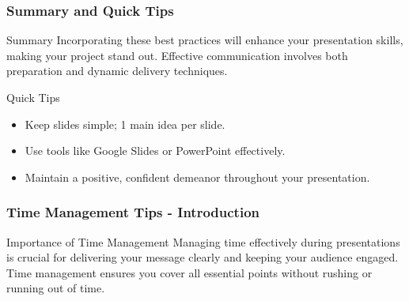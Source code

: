 \documentclass[aspectratio=169]{beamer}
\begin{document}
\begin{frame}[fragile]
    \frametitle{Summary and Quick Tips}
    \begin{block}{Summary}
        Incorporating these best practices will enhance your presentation skills, making your project stand out. 
        Effective communication involves both preparation and dynamic delivery techniques.
    \end{block}
    
    \begin{block}{Quick Tips}
        \begin{itemize}
            \item Keep slides simple; 1 main idea per slide.
            \item Use tools like Google Slides or PowerPoint effectively.
            \item Maintain a positive, confident demeanor throughout your presentation.
        \end{itemize}
    \end{block}
\end{frame}

\begin{frame}[fragile]
    \frametitle{Time Management Tips - Introduction}
    \begin{block}{Importance of Time Management}
        Managing time effectively during presentations is crucial for delivering your message clearly and keeping your audience engaged. Time management ensures you cover all essential points without rushing or running out of time.
    \end{block}
\end{frame}
\end{document}
